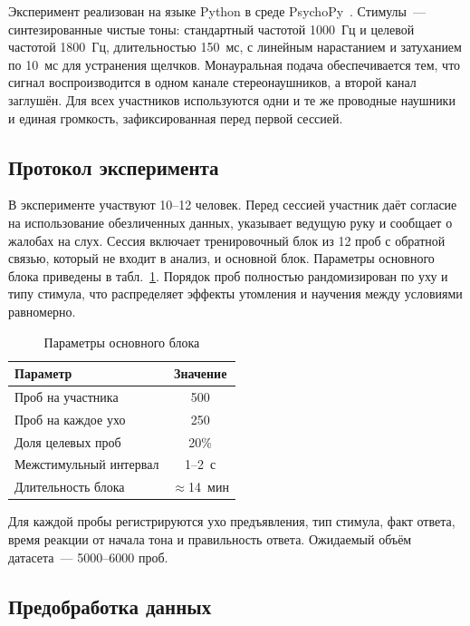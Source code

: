 \documentclass{misisarticle}
\begin{document}
Эксперимент реализован на языке Python в среде PsychoPy~\cite{peirce2019}. Стимулы~--- синтезированные чистые тоны: стандартный частотой 1000~Гц и целевой частотой 1800~Гц, длительностью 150~мс, с линейным нарастанием и затуханием по 10~мс для устранения щелчков. Монауральная подача обеспечивается тем, что сигнал воспроизводится в одном канале стереонаушников, а второй канал заглушён. Для всех участников используются одни и те же проводные наушники и единая громкость, зафиксированная перед первой сессией.

\subsection{Протокол эксперимента}

В эксперименте участвуют 10--12 человек. Перед сессией участник даёт согласие на использование обезличенных данных, указывает ведущую руку и сообщает о жалобах на слух. Сессия включает тренировочный блок из 12 проб с обратной связью, который не входит в анализ, и основной блок. Параметры основного блока приведены в табл.~\ref{tab:protocol}. Порядок проб полностью рандомизирован по уху и типу стимула, что распределяет эффекты утомления и научения между условиями равномерно.

\begin{table}[htbp]
  \caption{Параметры основного блока}
  \label{tab:protocol}
  \centering
  \begin{tabular}{lc}
    \toprule
    \textbf{Параметр} & \textbf{Значение} \\
    \midrule
    Проб на участника & 500 \\
    Проб на каждое ухо & 250 \\
    Доля целевых проб & 20\% \\
    Межстимульный интервал & 1--2~с \\
    Длительность блока & $\approx$14~мин \\
    \bottomrule
  \end{tabular}
\end{table}

Для каждой пробы регистрируются ухо предъявления, тип стимула, факт ответа, время реакции от начала тона и правильность ответа. Ожидаемый объём датасета~--- 5000--6000 проб.

\subsection{Предобработка данных}
\end{document}

